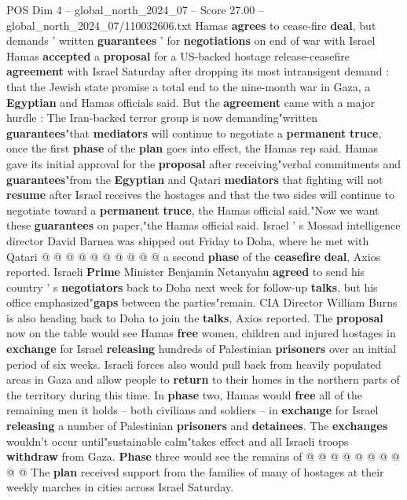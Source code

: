 \begin{textsample}{POS Dim 4 – global\_north\_2024\_07 – Score 27.00 – global\_north\_2024\_07/110032606.txt}  \label{ex:f4_pos_192}
Hamas \textbf{agrees} to cease-fire \textbf{deal}, but demands ' written \textbf{guarantees} ' for \textbf{negotiations} on end of war with Israel Hamas \textbf{accepted} a \textbf{proposal} for a US-backed hostage release-ceasefire \textbf{agreement} with Israel Saturday after dropping its most intransigent demand : that the Jewish state promise a total end to the nine-month war in Gaza, a \textbf{Egyptian} and Hamas officials said.
But the \textbf{agreement} came with a major hurdle : The Iran-backed terror group is now demanding"written \textbf{guarantees}"that \textbf{mediators} will continue to negotiate a \textbf{permanent} \textbf{truce}, once the first \textbf{phase} of the \textbf{plan} goes into effect, the Hamas rep said.
Hamas gave its initial approval for the \textbf{proposal} after receiving"verbal commitments and \textbf{guarantees}"from the \textbf{Egyptian} and Qatari \textbf{mediators} that fighting will not \textbf{resume} after Israel receives the hostages and that the two sides will continue to negotiate toward a \textbf{permanent} \textbf{truce}, the Hamas official said."Now we want these \textbf{guarantees} on paper,"the Hamas official said.
Israel ' s Mossad intelligence director David Barnea was shipped out Friday to Doha, where he met with Qatari @ @ @ @ @ @ @ @ @ @ a second \textbf{phase} of the \textbf{ceasefire} \textbf{deal}, Axios reported.
Israeli \textbf{Prime} Minister Benjamin Netanyahu \textbf{agreed} to send his country ' s \textbf{negotiators} back to Doha next week for follow-up \textbf{talks}, but his office emphasized"\textbf{gaps} between the parties"remain.
CIA Director William Burns is also heading back to Doha to join the \textbf{talks}, Axios reported.
The \textbf{proposal} now on the table would see Hamas \textbf{free} women, children and injured hostages in \textbf{exchange} for Israel \textbf{releasing} hundreds of Palestinian \textbf{prisoners} over an initial period of six weeks.
Israeli forces also would pull back from heavily populated areas in Gaza and allow people to \textbf{return} to their homes in the northern parts of the territory during this time.
In \textbf{phase} two, Hamas would \textbf{free} all of the remaining men it holds -- both civilians and soldiers -- in \textbf{exchange} for Israel \textbf{releasing} a number of Palestinian \textbf{prisoners} and \textbf{detainees}.
The \textbf{exchanges} wouldn't occur until"sustainable calm"takes effect and all Israeli troops \textbf{withdraw} from Gaza. \textbf{Phase} three would see the remains of @ @ @ @ @ @ @ @ @ @ The \textbf{plan} received support from the families of many of hostages at their weekly marches in cities across Israel Saturday.

\end{textsample}
